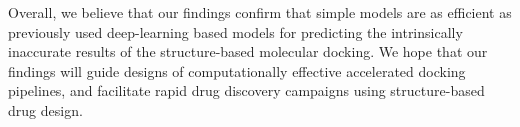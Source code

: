 Overall, we believe that our findings confirm that simple models are as efficient as previously used deep-learning based models for predicting the intrinsically inaccurate results of the structure-based molecular docking. We hope that our findings will guide designs of computationally effective accelerated docking pipelines, and facilitate rapid drug discovery campaigns using structure-based drug design.
